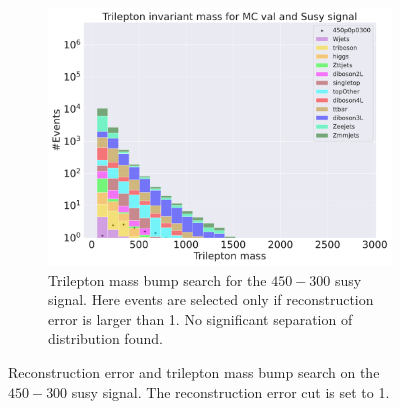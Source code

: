 \begin{figure}[h!]
\begin{subfigure}{.8\textwidth}
        \includegraphics[width=\textwidth]{Figures/AE_testing/b_data_recon_big_rm3_feats_sig_450p0p0300_Trilepton mass.pdf}
        \caption{Trilepton mass bump search for the $450-300$ susy signal. Here events are selected only if reconstruction error is larger than 1. No significant 
        separation of distribution found.}
        \label{fig:ae_susy_450_300_trilep}
    \end{subfigure}
    \hfill        
    \caption{Reconstruction error and trilepton mass bump search on the $450-300$ susy signal. The reconstruction error cut is set to 1. }
    \label{fig:ae_susy_450_300_recon_trilep}
\end{figure}


